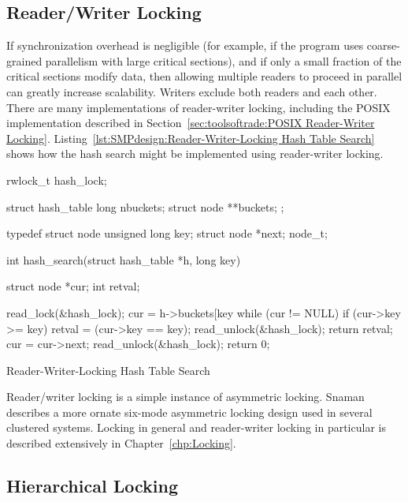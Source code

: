 \subsection{Reader/Writer Locking}
\label{sec:SMPdesign:Reader/Writer Locking}

If synchronization overhead is negligible (for example, if the program
uses coarse-grained parallelism with large critical sections), and if
only a small fraction of the critical sections modify data, then allowing
multiple readers to proceed in parallel can greatly increase scalability.
Writers exclude both readers and each other.
There are many implementations of reader-writer locking, including
the POSIX implementation described in
Section~\ref{sec:toolsoftrade:POSIX Reader-Writer Locking}.
Listing~\ref{lst:SMPdesign:Reader-Writer-Locking Hash Table Search}
shows how the hash search might be implemented using reader-writer locking.

\begin{listing}[tbp]
\begin{VerbatimL}[commandchars=\\\[\]]
rwlock_t hash_lock;

struct hash_table
{
	long nbuckets;
	struct node **buckets;
};

typedef struct node {
	unsigned long key;
	struct node *next;
} node_t;

int hash_search(struct hash_table *h, long key)
{
	struct node *cur;
	int retval;

	read_lock(&hash_lock);
	cur = h->buckets[key %
	while (cur != NULL) {
		if (cur->key >= key) {
			retval = (cur->key == key);
			read_unlock(&hash_lock);
			return retval;
		}
		cur = cur->next;
	}
	read_unlock(&hash_lock);
	return 0;
}
\end{VerbatimL}
\caption{Reader-Writer-Locking Hash Table Search}
\label{lst:SMPdesign:Reader-Writer-Locking Hash Table Search}
\end{listing}

Reader/writer locking is a simple instance of asymmetric locking.
Snaman~\cite{Snaman87} describes a more ornate six-mode
asymmetric locking design used in several clustered systems.
Locking in general and reader-writer locking in particular is described
extensively in
Chapter~\ref{chp:Locking}.

\subsection{Hierarchical Locking}
\label{sec:SMPdesign:Hierarchical Locking}

